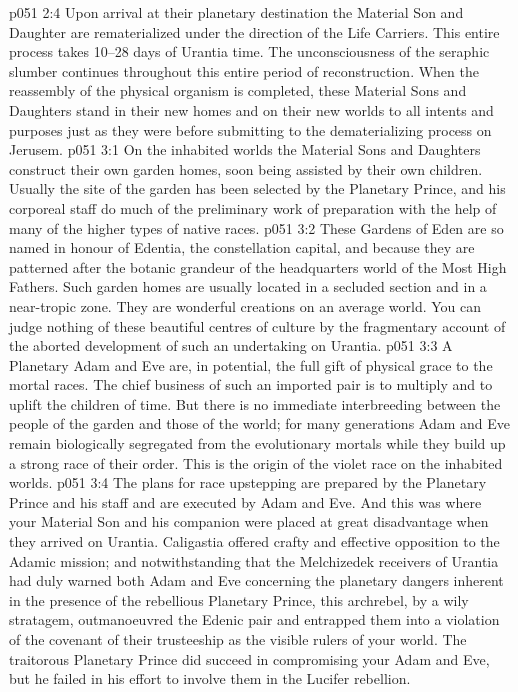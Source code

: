 \vs p051 2:4 \pc Upon arrival at their planetary destination the Material Son and Daughter are rematerialized under the direction of the Life Carriers. This entire process takes 10--28 days of Urantia time. The unconsciousness of the seraphic slumber continues throughout this entire period of reconstruction. When the reassembly of the physical organism is completed, these Material Sons and Daughters stand in their new homes and on their new worlds to all intents and purposes just as they were before submitting to the dematerializing process on Jerusem.
\vs p051 3:1 On the inhabited worlds the Material Sons and Daughters construct their own garden homes, soon being assisted by their own children. Usually the site of the garden has been selected by the Planetary Prince, and his corporeal staff do much of the preliminary work of preparation with the help of many of the higher types of native races.
\vs p051 3:2 These Gardens of Eden are so named in honour of Edentia, the constellation capital, and because they are patterned after the botanic grandeur of the headquarters world of the Most High Fathers. Such garden homes are usually located in a secluded section and in a near\hyp{}tropic zone. They are wonderful creations on an average world. You can judge nothing of these beautiful centres of culture by the fragmentary account of the aborted development of such an undertaking on Urantia.
\vs p051 3:3 \pc A Planetary Adam and Eve are, in potential, the full gift of physical grace to the mortal races. The chief business of such an imported pair is to multiply and to uplift the children of time. But there is no immediate interbreeding between the people of the garden and those of the world; for many generations Adam and Eve remain biologically segregated from the evolutionary mortals while they build up a strong race of their order. This is the origin of the violet race on the inhabited worlds.
\vs p051 3:4 The plans for race upstepping are prepared by the Planetary Prince and his staff and are executed by Adam and Eve. And this was where your Material Son and his companion were placed at great disadvantage when they arrived on Urantia. Caligastia offered crafty and effective opposition to the Adamic mission; and notwithstanding that the Melchizedek receivers of Urantia had duly warned both Adam and Eve concerning the planetary dangers inherent in the presence of the rebellious Planetary Prince, this archrebel, by a wily stratagem, outmanoeuvred the Edenic pair and entrapped them into a violation of the covenant of their trusteeship as the visible rulers of your world. The traitorous Planetary Prince did succeed in compromising your Adam and Eve, but he failed in his effort to involve them in the Lucifer rebellion.
